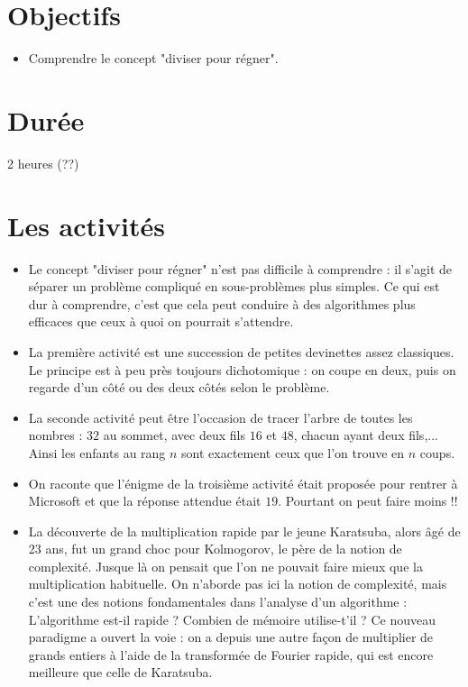 \documentclass[class=report,crop=false, 12pt]{standalone}
\begin{document}



\section*{Objectifs}

\begin{itemize}
  \item Comprendre le concept "diviser pour régner".
\end{itemize}


\section*{Durée}

2 heures (??)

\section*{Les activités}

\begin{itemize}
  \item Le concept "diviser pour régner" n'est pas difficile à comprendre : il s'agit de séparer un problème compliqué en sous-problèmes plus simples. Ce qui est dur à comprendre, c'est que cela peut conduire à des algorithmes plus efficaces que ceux à quoi on pourrait s'attendre. 
  
  \item La première activité est une succession de petites devinettes assez classiques. Le principe est à peu près toujours dichotomique : on coupe en deux, puis on regarde d'un côté ou des deux côtés selon le problème.
  
  \item La seconde activité peut être l'occasion de tracer l'arbre de toutes les nombres : $32$ au sommet, avec deux fils $16$ et $48$, chacun ayant deux fils,...
  Ainsi les enfants au rang $n$ sont exactement ceux que l'on trouve en $n$ coups.
  
  \item On raconte que l'énigme de la troisième activité était proposée pour rentrer à Microsoft et que la réponse attendue était $19$. Pourtant on peut faire moins !!
  
  \item La découverte de la multiplication rapide par le jeune Karatsuba, alors âgé de 23 ans, fut un grand choc pour Kolmogorov, le père de la notion de complexité. Jusque là on pensait que l'on ne pouvait faire mieux que la multiplication habituelle. 
On n'aborde pas ici la notion de complexité, mais c'est une des notions fondamentales dans l'analyse d'un algorithme : L'algorithme est-il rapide ? Combien de mémoire utilise-t'il ?  
  Ce nouveau paradigme a ouvert la voie : on a depuis une autre façon de multiplier de grands entiers à l'aide de la transformée de Fourier rapide, qui est  encore meilleure que celle de Karatsuba.
\end{itemize}
\end{document}
